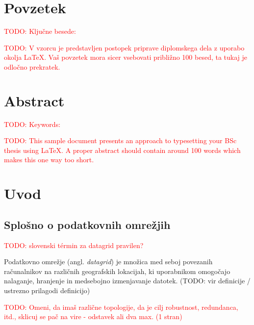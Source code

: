 \documentclass[a4paper, 12pt]{book}
\newcommand{\TODO}[1]{\textcolor{red}{TODO: #1}}
\newcommand{\clearemptydoublepage}{\newpage{\pagestyle{empty}\cleardoublepage}}
\begin{document}
\clearemptydoublepage


\chapter*{Povzetek}

\TODO{Ključne besede:}%

\TODO{V vzorcu je predstavljen postopek priprave diplomskega dela z uporabo okolja \LaTeX. Vaš povzetek mora sicer vsebovati približno 100 besed, ta tukaj je odločno prekratek.}
\clearemptydoublepage


\chapter*{Abstract}

\TODO{Keywords:}

\TODO{This sample document presents an approach to typesetting your BSc thesis using \LaTeX. A proper abstract should contain around 100 words which makes this one way too short.}


\clearemptydoublepage


\mainmatter
\setcounter{page}{1}
\pagestyle{fancy}

\chapter{Uvod}

\section{Splošno o podatkovnih omrežjih}

\TODO{slovenski términ za datagrid pravilen?}

Podatkovno omrežje (angl. \textit{datagrid}) je množica med seboj
povezanih računalnikov na različnih geografskih lokacijah, ki uporabnikom
omogočajo nalaganje, hranjenje in medsebojno izmenjavanje datotek.
(TODO: vir definicije / ustrezno prilagodi definicijo)

\TODO{Omeni, da imaš različne topologije, da je cilj robustnost, redundanca,
itd., sklicuj se pač na vire - odstavek ali dva max. (1 stran)}
\end{document}
